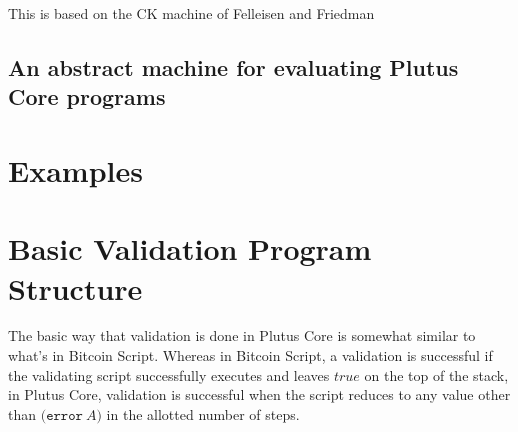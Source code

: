 \documentclass[a4paper]{article}
\newcommand{\keyword}[1]{\texttt{#1}}
\newcommand{\construct}[1]{\texttt{(} #1 \texttt{)}}
\newcommand{\error}[1]{\construct{\keyword{error} ~ #1}}
\begin{document}

This is based on the CK machine of Felleisen and Friedman~\cite{Felleisen-CK-CEK}


\subsection{An abstract machine for evaluating Plutus Core programs}





\section{Examples}



\section{Basic Validation Program Structure}

The basic way that validation is done in Plutus Core is somewhat similar to what's in Bitcoin Script. Whereas in Bitcoin Script, a validation is successful if the validating script successfully executes and leaves $\textit{true}$ on the top of the stack, in Plutus Core, validation is successful when the script reduces to any value other than \(\error{A}\) in the allotted number of steps.









%

%

%


%
\end{document}
